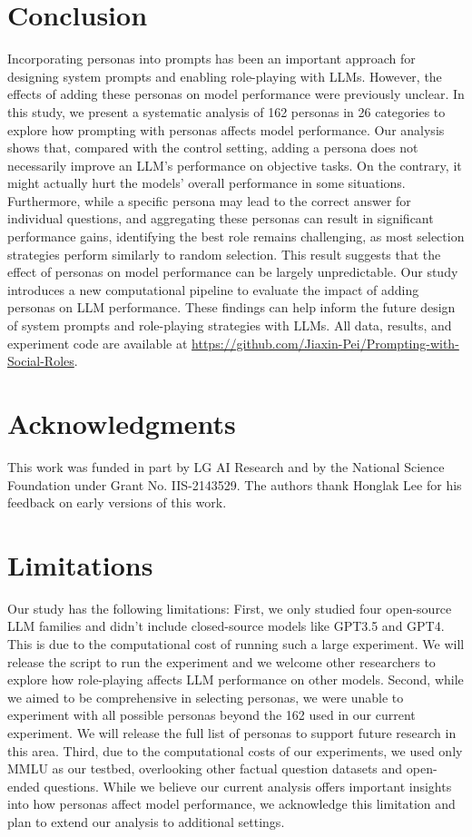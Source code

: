 \documentclass[11pt]{article}
\begin{document}
\section{Conclusion}
Incorporating personas into prompts has been an important approach for designing system prompts and enabling role-playing with LLMs. However, the effects of adding these personas on model performance were previously unclear. In this study, we present a systematic analysis of 162 personas in 26 categories to explore how prompting with personas affects model performance. Our analysis shows that, compared with the control setting, adding a persona does not necessarily improve an LLM’s performance on objective tasks. On the contrary, it might actually hurt the models' overall performance in some situations. Furthermore, while a specific persona may lead to the correct answer for individual questions, and aggregating these personas can result in significant performance gains, identifying the best role remains challenging, as most selection strategies perform similarly to random selection. This result suggests that the effect of personas on model performance can be largely unpredictable. Our study introduces a new computational pipeline to evaluate the impact of adding personas on LLM performance. These findings can help inform the future design of system prompts and role-playing strategies with LLMs. All data, results, and experiment code are available at \url{https://github.com/Jiaxin-Pei/Prompting-with-Social-Roles}.

\section*{Acknowledgments}
This work was funded in part by LG AI Research and by the National Science Foundation under Grant No. IIS-2143529. The authors thank Honglak Lee for his feedback on early versions of this work.

\section{Limitations}
Our study has the following limitations: First, we only studied four open-source LLM families and didn't include closed-source models like GPT3.5 and GPT4. This is due to the computational cost of running such a large experiment. We will release the script to run the experiment and we welcome other researchers to explore how role-playing affects LLM performance on other models.  Second, while we aimed to be comprehensive in selecting personas, we were unable to experiment with all possible personas beyond the 162 used in our current experiment. We will release the full list of personas to support future research in this area. Third, due to the computational costs of our experiments, we used only MMLU as our testbed, overlooking other factual question datasets and open-ended questions. While we believe our current analysis offers important insights into how personas affect model performance, we acknowledge this limitation and plan to extend our analysis to additional settings. 
\end{document}

